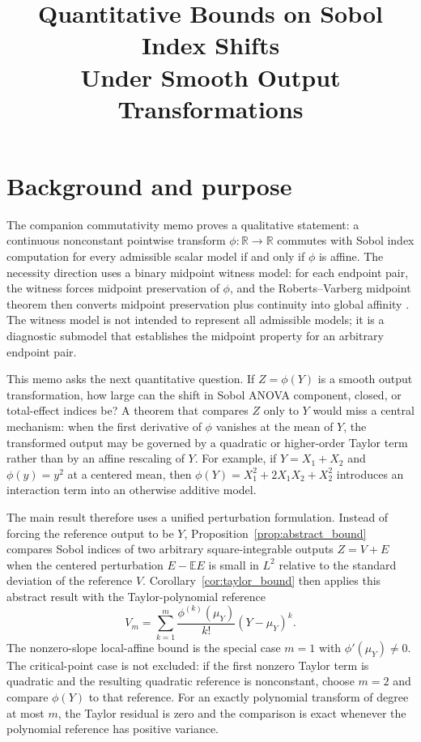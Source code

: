 \documentclass[11pt,letterpaper]{article}
\title{Quantitative Bounds on Sobol Index Shifts\\
Under Smooth Output Transformations}
\author{}
\date{}
\newcommand{\E}{\mathbb{E}}
\newcommand{\R}{\mathbb{R}}
\theoremstyle{remark}
\begin{document}
\maketitle

\section{Background and purpose}
\label{sec:background}

The companion commutativity memo proves a qualitative statement: a continuous
nonconstant pointwise transform $\phi\colon\R\to\R$ commutes with Sobol index
computation for every admissible scalar model if and only if $\phi$ is affine.
The necessity direction uses a binary midpoint witness model: for each endpoint
pair, the witness forces midpoint preservation of $\phi$, and the
Roberts--Varberg midpoint theorem then converts midpoint preservation plus
continuity into global affinity \citep[Theorem~4.1]{RobertsVarberg1973}. The
witness model is not intended to represent all admissible models; it is a
diagnostic submodel that establishes the midpoint property for an arbitrary
endpoint pair.

This memo asks the next quantitative question. If $Z=\phi(Y)$ is a smooth
output transformation, how large can the shift in Sobol ANOVA component,
closed, or total-effect indices be? A theorem that compares $Z$ only to $Y$
would miss a central mechanism: when the first derivative of $\phi$ vanishes at
the mean of $Y$, the transformed output may be governed by a quadratic or
higher-order Taylor term rather than by an affine rescaling of $Y$. For example,
if $Y=X_1+X_2$ and $\phi(y)=y^2$ at a centered mean, then
$\phi(Y)=X_1^2+2X_1X_2+X_2^2$ introduces an interaction term into an otherwise
additive model.

The main result therefore uses a unified perturbation formulation. Instead of
forcing the reference output to be $Y$, Proposition~\ref{prop:abstract_bound}
compares Sobol indices of two arbitrary square-integrable outputs $Z=V+E$ when
the centered perturbation $E-\E E$ is small in $L^2$ relative to the standard
deviation of the reference $V$. Corollary~\ref{cor:taylor_bound} then applies
this abstract result with the Taylor-polynomial reference
\begin{equation}
  V_m=\sum_{k=1}^{m}\frac{\phi^{(k)}(\mu_Y)}{k!}(Y-\mu_Y)^k.
\end{equation}
The nonzero-slope local-affine bound is the special case $m=1$ with
$\phi'(\mu_Y)\neq0$. The critical-point case is not excluded: if the first
nonzero Taylor term is quadratic and the resulting quadratic reference is
nonconstant, choose $m=2$ and compare $\phi(Y)$ to that reference. For an exactly
polynomial transform of degree at most $m$, the Taylor residual is zero and the
comparison is exact whenever the polynomial reference has positive variance.
\end{document}
